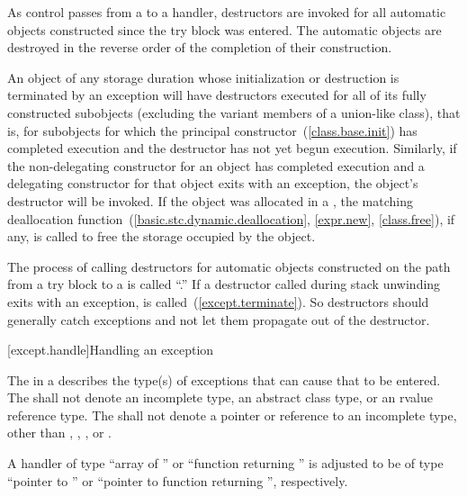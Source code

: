 \pnum
As control passes from a
to a handler,
destructors are invoked for all automatic objects constructed since the
try block was entered.
The automatic objects are destroyed in the reverse order of the completion
of their construction.

\pnum
An object
of any storage duration whose initialization or destruction is terminated by an exception
will have
destructors executed for all of its fully constructed
subobjects (excluding the variant members of a union-like class),
that is, for subobjects for which the principal
constructor~(\ref{class.base.init}) has completed execution
and the destructor has not yet begun execution.
Similarly, if the non-delegating constructor for an object has
completed execution and a delegating constructor for that object exits with
an exception, the object's destructor will be invoked.
If the object was allocated in a
,
the matching deallocation function~(\ref{basic.stc.dynamic.deallocation}, \ref{expr.new}, \ref{class.free}),
if any, is called to free the storage occupied by the
object.

\pnum
{}%
The process of calling destructors for automatic objects constructed on the
path from a try block to a
is called
``.''
If a destructor called during stack unwinding exits with an exception,
is called~(\ref{except.terminate}).
\enternote
So destructors should generally catch
exceptions and not let them propagate out of the destructor.
\exitnote


[except.handle]{Handling an exception}
%

\pnum
The
in a
describes the type(s) of exceptions that can cause
that
to be entered.
%
%
%
%
The
shall not denote an incomplete type, an abstract class type, or an rvalue reference type.
The
shall not denote a pointer or reference to an
incomplete type, other than
,
,
,
or
.

\pnum
A handler of type ``array of
''
or ``function returning
''
is adjusted to be of type ``pointer to
''
or ``pointer to function
returning
'',
respectively.

